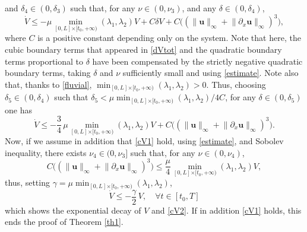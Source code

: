 \documentclass[11pt]{article}
\numberwithin{equation}{section}
\theoremstyle{definition}
\begin{document}
and $\delta_{4}\in(0,\delta_{3})$
such that, for any $\nu\in(0,\nu_{3})$,
and any $\delta\in(0,\delta_{4})$,
\begin{equation*}
\dot V\leq -\mu\min\limits_{[0,L]{\times[t_{0},+\infty)}}(\lambda_{1},\lambda_{2})V+C\delta V +C\bigl(\left(\lVert\boldsymbol{u}\rVert_{\infty}+\lVert\partial_{x}\boldsymbol{u}\rVert_{\infty}\right)^{{3}} \bigr),
\end{equation*}
where $C$ is a positive constant depending only on the system. Note that here, the cubic boundary terms that appeared in \eqref{dVtot} and the quadratic boundary terms proportional to $\delta$ have been compensated by the strictly negative quadratic boundary terms, taking $\delta$ and $\nu$ sufficiently small and using \eqref{estimate}. Note also that, thanks to \eqref{fluvial}, $\min_{[0,L]{\times[t_{0},+\infty)}}(\lambda_{1},\lambda_{2})>0$. Thus, choosing $\delta_{5}\in(0,\delta_{4})$ such that \hbox{$\delta_{5}<\mu\min_{[0,L]{\times[t_{0},+\infty)}}(\lambda_{1},\lambda_{2})/4C$}, for any $\delta\in(0,\delta_{5})$ one has
\begin{equation*}
\dot V\leq -\frac{3}{4}\,\mu\min\limits_{[0,L]{\times[t_{0},+\infty)}}(\lambda_{1},\lambda_{2})V+C \bigl(\left(\lVert\boldsymbol{u}\rVert_{\infty}+\lVert\partial_{x}\boldsymbol{u}\rVert_{\infty}\right)^{{3}} \bigr).
\end{equation*}
Now, if we assume in addition that \eqref{cV1} hold, using \eqref{estimate}, and Sobolev inequality, there exists $\nu_{4}\in(0,\nu_{3}]$ such that, for any $\nu\in(0,\nu_{4})$,
\begin{equation*}
C \bigl(\left(\lVert\boldsymbol{u}\rVert_{\infty}+\lVert\partial_{x}\boldsymbol{u}\rVert_{\infty}\right)^{{3}} \bigr)\leq \frac{\mu}{4}\min\limits_{[0,L]{\times[t_{0},+\infty)}}(\lambda_{1},\lambda_{2})V,
\end{equation*}
thus, setting $\gamma=\mu\min_{[0,L]{\times[t_{0},+\infty)}}(\lambda_{1},\lambda_{2})$,
\begin{equation*}
\dot V\leq -\frac{\gamma}{2}\, V{,\quad\forall t\in[t_{0},T]}
\end{equation*}
which shows the exponential decay of $V$ and \eqref{cV2}. {If in addition \eqref{cV1} holds, this}
ends the proof of Theorem \ref{th1}.
\end{document}
